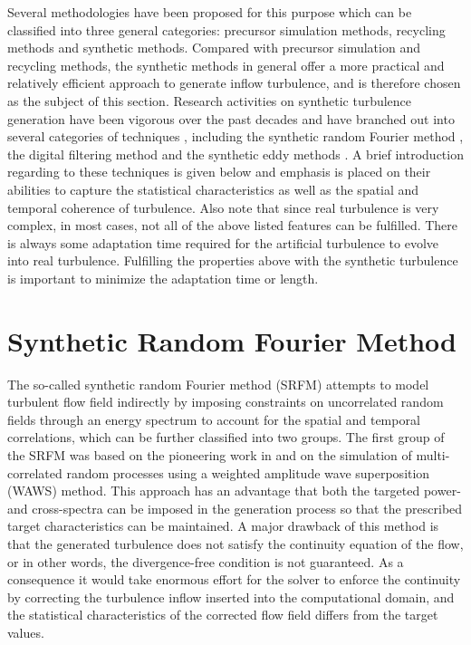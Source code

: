 \noindent Several methodologies have been proposed for this purpose which can be classified into three general categories: precursor simulation methods, recycling methods and synthetic methods. Compared with precursor simulation and recycling methods, the synthetic methods in general offer a more practical and relatively efficient approach to generate inflow turbulence, and is therefore chosen as the subject of this section. Research activities on synthetic turbulence generation have been vigorous over the past decades and have branched out into several categories of techniques \citep{wu2017}, including the synthetic random Fourier method \citep{kraichnan1970, hoshiya1972}, the digital filtering method \citep{klein2003, xie2008, kim2013} and the synthetic eddy methods \citep{jarrin2006, poletto2013, kroger2018}. A brief introduction regarding to these techniques is given below and emphasis is placed on their abilities to capture the statistical characteristics as well as the spatial and temporal coherence of turbulence. Also note that since real turbulence is very complex, in most cases, not all of the above listed features can be fulfilled. There is always some adaptation time required for the artificial turbulence to evolve into real turbulence. Fulfilling the properties above with the synthetic turbulence is important to minimize the adaptation time or length.

\section{Synthetic Random Fourier Method}

The so-called synthetic random Fourier method (SRFM) attempts to model turbulent flow field indirectly by imposing constraints on uncorrelated random fields through an energy spectrum to account for the spatial and temporal correlations, which can be further classified into two groups. 
The first group of the SRFM was based on the pioneering work in \cite{hoshiya1972} and \cite{shinozuka1972} on the simulation of multi-correlated random processes using a weighted amplitude wave superposition (WAWS) method. This approach has an advantage that both the targeted power- and cross-spectra can be imposed in the generation process so that the prescribed target characteristics can be maintained. A major drawback of this method is that the generated turbulence does not satisfy the continuity equation of the flow, or in other words, the divergence-free condition is not guaranteed. As a consequence it would take enormous effort for the solver to enforce the continuity by correcting the turbulence inflow inserted into the computational domain, and the statistical characteristics of the corrected flow field differs from the target values.

